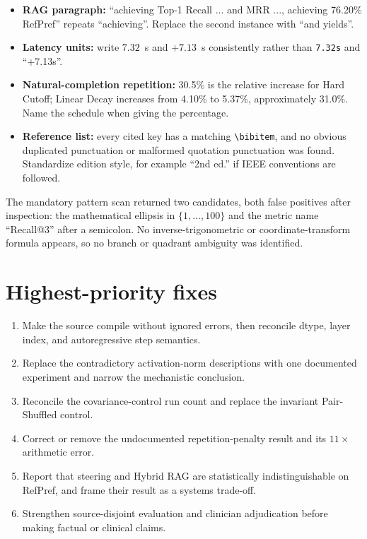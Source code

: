 \documentclass[11pt]{article}
\begin{document}
\begin{itemize}
 \item \textbf{RAG paragraph:} ``achieving Top-1 Recall ... and MRR ..., achieving 76.20\% RefPref'' repeats ``achieving''.  Replace the second instance with ``and yields''.
 \item \textbf{Latency units:} write $7.32$~s and $+7.13$~s consistently rather than \texttt{7.32s} and ``+7.13s''.
 \item \textbf{Natural-completion repetition:} 30.5\% is the relative increase for Hard Cutoff; Linear Decay increases from 4.10\% to 5.37\%, approximately 31.0\%.  Name the schedule when giving the percentage.
 \item \textbf{Reference list:} every cited key has a matching \verb|\bibitem|, and no obvious duplicated punctuation or malformed quotation punctuation was found.  Standardize edition style, for example ``2nd ed.'' if IEEE conventions are followed.
\end{itemize}

The mandatory pattern scan returned two candidates, both false positives after inspection: the mathematical ellipsis in $\{1,\ldots,100\}$ and the metric name ``Recall@3'' after a semicolon.  No inverse-trigonometric or coordinate-transform formula appears, so no branch or quadrant ambiguity was identified.

\section*{Highest-priority fixes}

\begin{enumerate}
 \item Make the source compile without ignored errors, then reconcile dtype, layer index, and autoregressive step semantics.
 \item Replace the contradictory activation-norm descriptions with one documented experiment and narrow the mechanistic conclusion.
 \item Reconcile the covariance-control run count and replace the invariant Pair-Shuffled control.
 \item Correct or remove the undocumented repetition-penalty result and its $11\times$ arithmetic error.
 \item Report that steering and Hybrid RAG are statistically indistinguishable on RefPref, and frame their result as a systems trade-off.
 \item Strengthen source-disjoint evaluation and clinician adjudication before making factual or clinical claims.
\end{enumerate}
\end{document}
